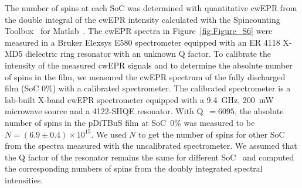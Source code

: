 The number of spins at each SoC was determined with quantitative cwEPR from the double integral of the cwEPR intensity calculated with the Spincounting Toolbox~\cite{spin_counting_tb} for Matlab~\cite{SI:Matlab}. The cwEPR spectra in Figure~\ref{fig:Figure_S6} were measured in a Bruker Elexsys E580 spectrometer equipped with an ER 4118 X-MD5 dielectric ring resonator with an unknown Q factor. To calibrate the intensity of the measured cwEPR signals and to determine the absolute number of spins in the film, we measured the cwEPR spectrum of the fully discharged film (SoC 0\%) with a calibrated spectrometer. The calibrated spectrometer is a lab-built X-band cwEPR spectrometer equipped with a 9.4~GHz, 200~mW microwave source and a 4122-SHQE resonator. With Q~$=6095$, the absolute number of spins in the pDiTBuS film at SoC~0\% was measured to be $N=(6.9\pm0.4)\times10^{15}$. We used $N$ to get the number of spins for other SoC from the spectra measured with the uncalibrated spectrometer. We assumed that the Q factor of the resonator remains the same for different SoC~\cite{Kulikov2022} and computed the corresponding numbers of spins from the doubly integrated spectral intensities.\\

